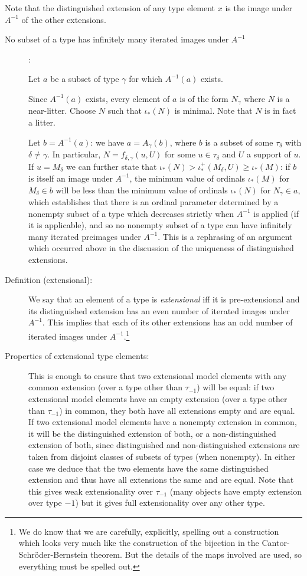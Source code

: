 \documentclass[112pt]{article}
\begin{document}
Note that the distinguished extension of any type element $x$ is the image under $A^{-1}$ of the other extensions.

\begin{description}

\item[No subset of a type has infinitely many iterated images under $A^{-1}$]:

Let $a$ be a subset of type $\gamma$ for which $A^{-1}(a)$ exists.  

Since $A^{-1}(a)$ exists, every element of $a$ is of the form $N_\gamma$ where $N$ is a near-litter.  Choose $N$ such that $\iota_*(N)$ is minimal.  Note that $N$ is in fact a litter.

Let $b = A^{-1}(a)$:  we have $a = A_\gamma(b)$, where $b$ is a subset of some $\tau_\delta$ with $\delta \neq \gamma$.  In particular, $N = f_{\delta,\gamma}(u,U)$ for
some $u \in \tau_\delta$ and $U$ a support of $u$.  If $u=M_\delta$ we can further state that $\iota_*(N) > \iota^+_*(M_\delta,U) \geq \iota_*(M)$:  if $b$ is itself an image under $A^{-1}$, the minimum value of ordinals $\iota_*(M)$ for $M_\delta \in b$ will be less than the minimum value of ordinals $\iota_*(N)$ for $N_\gamma\in a$, which establishes that there is an ordinal parameter determined by a nonempty subset of a type which decreases strictly when $A^{-1}$ is applied (if it is applicable), and so no nonempty subset of a type
can have infinitely many iterated preimages under $A^{-1}$.  This is a rephrasing of an argument which occurred above in the discussion of the uniqueness of distinguished extensions.

\item[Definition (extensional):]  We say that an element of a type is {\em extensional\/} iff
it is pre-extensional and its distinguished extension has an even number of iterated images under $A^{-1}$.
This implies that each of its other extensions has an odd number of iterated images under $A^{-1}$.\footnote{We do know that we are carefully, explicitly, spelling out a construction which looks very much
like the construction of the bijection in the Cantor-Schr\"oder-Bernstein theorem.  But the details of the maps involved are used, so everything must be spelled out.}

\item[Properties of extensional type elements:]   This is enough to ensure that two extensional model elements with any common extension (over a type other than $\tau_{-1}$) will be equal:  if two extensional model elements have an empty extension (over a type other than $\tau_{-1}$) in common, they both have all extensions empty and are equal.  If two extensional model elements have a nonempty extension in common, it will be the distinguished extension of both, or a non-distinguished extension of both, since distinguished and non-distinguished extensions are taken from disjoint classes of subsets of types (when nonempty).
In either case we deduce that the two elements have the same distinguished extension and thus have all extensions the same and are equal.  Note that this gives weak extensionality over $\tau_{-1}$ (many objects have empty extension over type $-1$) but it gives full extensionality over any other type.


\end{description}
\end{document}
